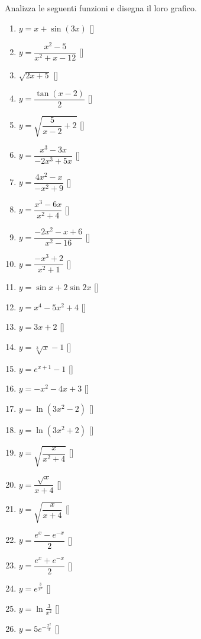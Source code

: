 \bigskip

\begin{esercizio}\label{ese:stufun.7e}
Analizza le seguenti funzioni e disegna il loro grafico.
\begin{enumerate} [label=\alph*)]
\item \(y = x + \sin(3x)\)
\hfill []
\item \(y = \dfrac{x^2 -5}{x^2 +x -12}\)
\hfill []
\item \(\sqrt{2x +5}\)
\hfill []
\item \(y = \dfrac{\tan(x -2)}{2}\)
\hfill []
\item \(y = \sqrt{\dfrac{5}{x -2} +2}\)
\hfill []
\item \(y = \dfrac{x^3 -3x}{-2x^3 +5x}\)
\hfill []
\item \(y = \dfrac{4x^2 -x}{-x^2 +9}\)
\hfill []
\item \(y = \dfrac{x^3 -6x}{x^2 +4}\)
\hfill []
\item \(y = \dfrac{-2x^2 -x +6}{x^2 -16}\)
\hfill []
\item \(y = \dfrac{-x^3 +2}{x^2 +1}\)
\hfill []
\item \(y = \sin x +2 \sin 2x\)
\hfill []
\item \(y = x^4 -5x^2 +4\)
\hfill []
\item \(y = 3x +2\)
\hfill []
\item \(y = \sqrt[3]{x} -1\)
\hfill []
\item \(y = e^{x +1} -1\)
\hfill []
\item \(y = -x^2 -4x +3\)
\hfill []
\item \(y = \ln(3x^2 -2)\)
\hfill []
\item \(y = \ln(3x^2 +2)\)
\hfill []
\item \(y = \sqrt{\dfrac{x}{x^2 +4}}\)
\hfill []
\item \(y = \dfrac{\sqrt{x}}{x +4}\)
\hfill []
\item \(y = \sqrt{\dfrac{x}{x +4}}\)
\hfill []
\item \(y = \dfrac{e^{x} -e^{-x}}{2}\)
\hfill []
\item \(y = \dfrac{e^{x} +e^{-x}}{2}\)
\hfill []
\item \(y = e^{\frac{3}{x^2}}\)
\hfill []
\item \(y = \ln{\frac{3}{x^2}}\)
\hfill []
\item \(y = 5e^{-\frac{x^2}{3}}\)
\hfill []
\end{enumerate}
\end{esercizio}

\begin{comment}
 
\begin{esercizio}
\label{ese:}
\end{esercizio}

\end{comment}
